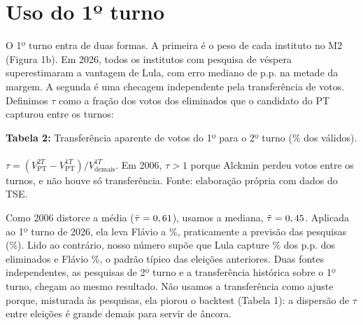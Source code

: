 \documentclass[10pt,a4paper]{article}
\begin{document}
\section{Uso do 1º turno}
O 1º turno entra de duas formas. A primeira é o peso de cada instituto no M2 (Figura 1b). Em 2026, todos os institutos com pesquisa de véspera superestimaram a vantagem de Lula, com erro mediano de \medErroUmT{} p.p. na metade da margem. A segunda é uma checagem independente pela transferência de votos. Definimos $\tau$ como a fração dos votos dos eliminados que o candidato do PT capturou entre os turnos:

\begin{center}\small
\textbf{Tabela 2:} Transferência aparente de votos do 1º para o 2º turno (\% dos válidos).\\[1pt]
\\[1pt]
{\footnotesize $\tau=(V^{2T}_{\text{PT}}-V^{1T}_{\text{PT}})/V^{1T}_{\text{demais}}$. Em 2006, $\tau>1$ porque Alckmin perdeu votos entre os turnos, e não houve só transferência. Fonte: elaboração própria com dados do TSE.}
\end{center}

Como 2006 distorce a média ($\bar\tau=0,61$), usamos a mediana, $\tilde\tau=0,45$. Aplicada ao 1º turno de 2026, ela leva Flávio a \priorMedianaFlavio\%, praticamente a previsão das pesquisas (\pFlavio\%). Lido ao contrário, nosso número supõe que Lula capture \tauImplLula\% dos \tercUmT{} p.p. dos eliminados e Flávio \tauImplFlavio\%, o padrão típico das eleições anteriores. Duas fontes independentes, as pesquisas de 2º turno e a transferência histórica sobre o 1º turno, chegam ao mesmo resultado. Não usamos a transferência como ajuste porque, misturada às pesquisas, ela piorou o backtest (Tabela 1): a dispersão de $\tau$ entre eleições é grande demais para servir de âncora.
\end{document}
